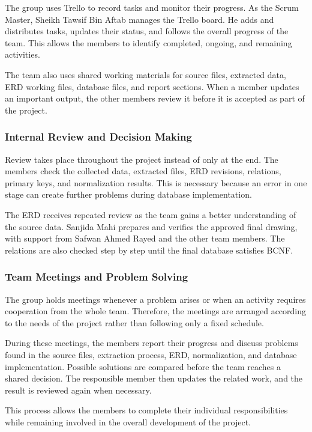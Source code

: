 The group uses Trello to record tasks and monitor their progress. As the
Scrum Master, Sheikh Tawsif Bin Aftab manages the Trello board. He adds and
distributes tasks, updates their status, and follows the overall progress of
the team. This allows the members to identify completed, ongoing, and
remaining activities.

The team also uses shared working materials for source files, extracted
data, ERD working files, database files, and report sections. When a member
updates an important output, the other members review it before it is
accepted as part of the project.

\subsubsection{Internal Review and Decision Making}

Review takes place throughout the project instead of only at the end.
The members check the collected data, extracted files, ERD revisions,
relations, primary keys, and normalization results. This is necessary
because an error in one stage can create further problems during database
implementation.

The ERD receives repeated review as the team gains a better understanding of
the source data. Sanjida Mahi prepares and verifies the approved final drawing,
with support from Safwan Ahmed Rayed and the other team members. The relations
are also checked step by step until the final database satisfies BCNF.

\subsubsection{Team Meetings and Problem Solving}

The group holds meetings whenever a problem arises or when an activity
requires cooperation from the whole team. Therefore, the meetings are
arranged according to the needs of the project rather than following only
a fixed schedule.

During these meetings, the members report their progress and discuss
problems found in the source files, extraction process, ERD, normalization,
and database implementation. Possible solutions are compared before the
team reaches a shared decision. The responsible member then updates the
related work, and the result is reviewed again when necessary.

This process allows the members to complete their individual
responsibilities while remaining involved in the overall development of
the project.

